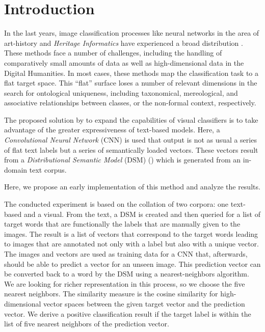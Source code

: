 \section{Introduction}
In the last years, image classification processes like neural networks in the area of art-history and \emph{Heritage Informatics} have experienced a broad distribution \parencite{lang_AttestingSimilaritySupportingOrganizationStudy_2018}.
These methods face a number of challenges, including the handling of comparatively small amounts of data as well as high-dimensional data in the Digital Humanities. In most cases, these methods map the classification task to a flat target space. This \enquote{flat} surface loses a number of relevant dimensions in the search for ontological uniqueness, including taxonomical, mereological, and associative relationships between classes, or the non-formal context, respectively.

The proposed solution by \citeauthor{donig_VomBildTextUndWieder_2019a} \parencite{donig_VomBildTextUndWieder_2019a} to expand the capabilities of visual classifiers is to take advantage of the greater expressiveness of text-based models. Here, a \emph{Convolutional Neural Network} (CNN) is used that output is not as usual a series of flat text labels but a series of semantically loaded vectors. These vectors result from a \emph{Distributional Semantic Model} (DSM) (\cite{lenci_DistributionalModelsWordMeaning_2018a}) which is generated from an in-domain text corpus.


Here, we propose an early implementation of this method and analyze the results.

The conducted experiment is based on the collation of two corpora: one text-based and a visual. From the text, a DSM is created and then queried for a list of target words that are functionally the labels that are manually given to the images. The result is a list of vectors that correspond to the target words leading to images that are annotated not only with a label but also with a unique vector. The images and vectors are used as training data for a CNN that, afterwards, should be able to predict a vector for an unseen image. This prediction vector can be converted back to a word by the DSM using a nearest-neighbors algorithm. We are looking for richer representation in this process, so we choose the five nearest neighbors. The similarity measure is the cosine similarity for high-dimensional vector spaces between the given target vector and the prediction vector. We derive a positive classification result if the target label is within the list of five nearest neighbors of the prediction vector.

